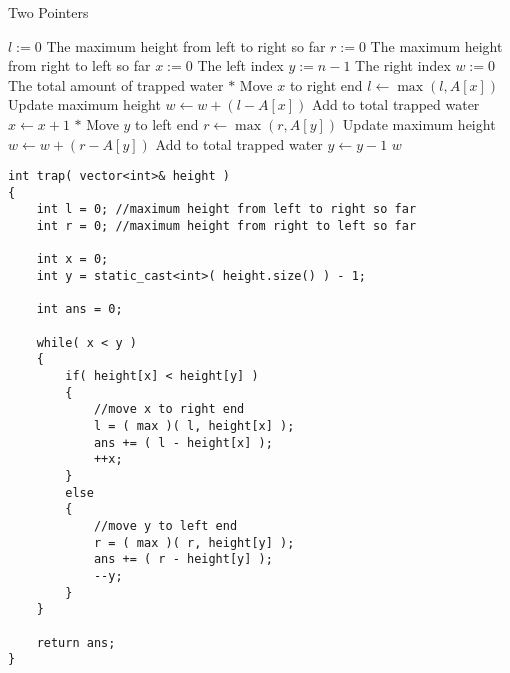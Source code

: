\begin{algorithm}[H]
\caption{Two Pointers}
\begin{algorithmic}[1]
\State $l:=0$ \Comment The maximum height from left to right so far
\State $r:=0$ \Comment The maximum height from right to left so far
\State $x:=0$ \Comment The left index
\State $y:=n-1$ \Comment The right index
\State $w:=0$ \Comment The total amount of trapped water
\State $\ast$ Move $x$ to right end
\State $l\gets \max(l, A[x])$ \Comment Update maximum height 
\State $w\gets w + (l-A[x])$ \Comment Add to total trapped water
\State $x\gets x+1$
\Else
\State $\ast$ Move $y$ to left end
\State $r\gets \max(r, A[y])$ \Comment Update maximum height 
\State $w\gets w + (r-A[y])$ \Comment Add to total trapped water
\State $y\gets y-1$
\EndIf
\EndWhile
\State \Return $w$
\EndProcedure
\end{algorithmic}
\end{algorithm}

\setcounter{lstlisting}{0}
\begin{lstlisting}[style=customc, caption={Two Pointers}]
int trap( vector<int>& height )
{
    int l = 0; //maximum height from left to right so far
    int r = 0; //maximum height from right to left so far

    int x = 0;
    int y = static_cast<int>( height.size() ) - 1;

    int ans = 0;

    while( x < y )
    {
        if( height[x] < height[y] )
        {
            //move x to right end
            l = ( max )( l, height[x] );
            ans += ( l - height[x] );
            ++x;
        }
        else
        {
            //move y to left end
            r = ( max )( r, height[y] );
            ans += ( r - height[y] );
            --y;
        }
    }

    return ans;
}
\end{lstlisting}